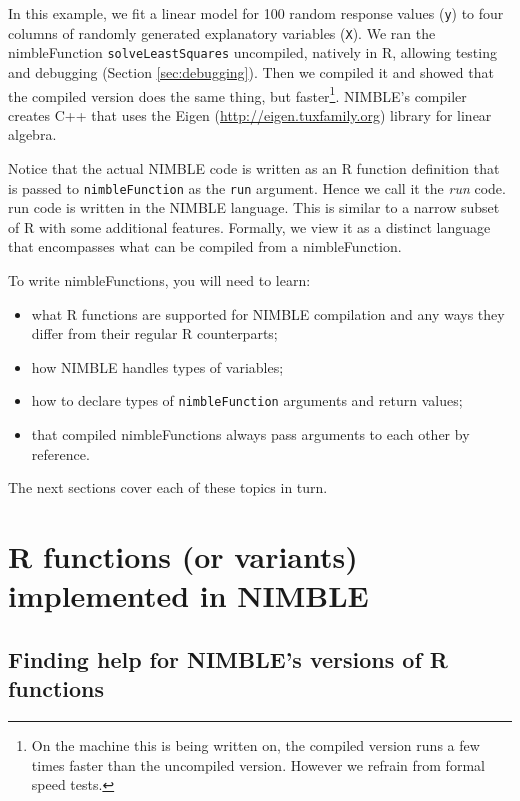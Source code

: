\documentclass[12pt,oneside]{book}\usepackage[]{graphicx}\usepackage[]{color}
\def\cd#1{\texttt{#1}}
\def\nm#1{\textit{#1}}
\begin{document}
In this example, we fit a linear model for 100 random response values (\cd{y}) to four columns of
randomly generated explanatory variables (\cd{X}).  We ran the
nimbleFunction 
\cd{solveLeastSquares} uncompiled,
natively in R, allowing testing and debugging (Section \ref{sec:debugging}).  Then we compiled it and showed that the compiled version does the same thing,
but faster\footnote{On the machine this is
  being written on, the compiled version runs a few times faster than
  the uncompiled version.  However we refrain from formal speed
  tests.}.  NIMBLE's compiler creates C++ that uses the Eigen (\href{http://eigen.tuxfamily.org}{http://eigen.tuxfamily.org})
library for linear algebra.

Notice that the actual NIMBLE code is written as an R function
definition that is passed to \cd{nimbleFunction} as the \cd{run}
argument.  Hence we call it the \nm{run} code.  run code is
written in the NIMBLE language.  This is similar to a narrow subset of
R with some additional features.  Formally, we view it as a distinct language
 that encompasses what can be compiled from a nimbleFunction.

To write nimbleFunctions, you will need to learn:

\begin{itemize}
\item what R functions are supported for NIMBLE compilation and any
  ways they differ from their regular R counterparts;
\item how NIMBLE handles types of variables;
\item how to declare types of \cd{nimbleFunction} arguments and return values;
\item that compiled nimbleFunctions always pass arguments to each
  other by reference.
\end{itemize}

The next sections cover each of these topics in turn.

\section{R functions (or variants) implemented in NIMBLE}
\label{sec:r-fiunctions-implemented}

\subsection{Finding help for NIMBLE's versions of R functions}
\end{document}
